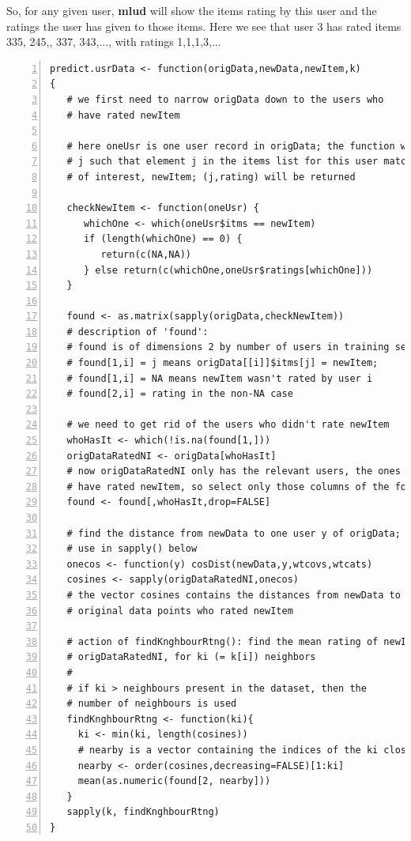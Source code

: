 So, for any given user, \textbf{mlud} will show the items rating by this
user and the ratings the user has given to those items.  Here we see
that user 3 has rated items 335, 245,, 337, 343,..., with ratings 1,1,1,3,...

\begin{lstlisting}[numbers=left]
predict.usrData <- function(origData,newData,newItem,k)
{
   # we first need to narrow origData down to the users who 
   # have rated newItem

   # here oneUsr is one user record in origData; the function will look for a 
   # j such that element j in the items list for this user matches the item 
   # of interest, newItem; (j,rating) will be returned

   checkNewItem <- function(oneUsr) {
      whichOne <- which(oneUsr$itms == newItem)
      if (length(whichOne) == 0) {
         return(c(NA,NA))
      } else return(c(whichOne,oneUsr$ratings[whichOne]))
   }

   found <- as.matrix(sapply(origData,checkNewItem))
   # description of 'found':
   # found is of dimensions 2 by number of users in training set
   # found[1,i] = j means origData[[i]]$itms[j] = newItem;
   # found[1,i] = NA means newItem wasn't rated by user i
   # found[2,i] = rating in the non-NA case

   # we need to get rid of the users who didn't rate newItem
   whoHasIt <- which(!is.na(found[1,]))
   origDataRatedNI <- origData[whoHasIt]
   # now origDataRatedNI only has the relevant users, the ones who 
   # have rated newItem, so select only those columns of the found matrix
   found <- found[,whoHasIt,drop=FALSE]

   # find the distance from newData to one user y of origData; defined for
   # use in sapply() below
   onecos <- function(y) cosDist(newData,y,wtcovs,wtcats)
   cosines <- sapply(origDataRatedNI,onecos)
   # the vector cosines contains the distances from newData to all the
   # original data points who rated newItem

   # action of findKnghbourRtng(): find the mean rating of newItem in
   # origDataRatedNI, for ki (= k[i]) neighbors
   #
   # if ki > neighbours present in the dataset, then the 
   # number of neighbours is used
   findKnghbourRtng <- function(ki){
     ki <- min(ki, length(cosines))
     # nearby is a vector containing the indices of the ki closest neighbours
     nearby <- order(cosines,decreasing=FALSE)[1:ki]
     mean(as.numeric(found[2, nearby]))
   }
   sapply(k, findKnghbourRtng)
}
\end{lstlisting}

